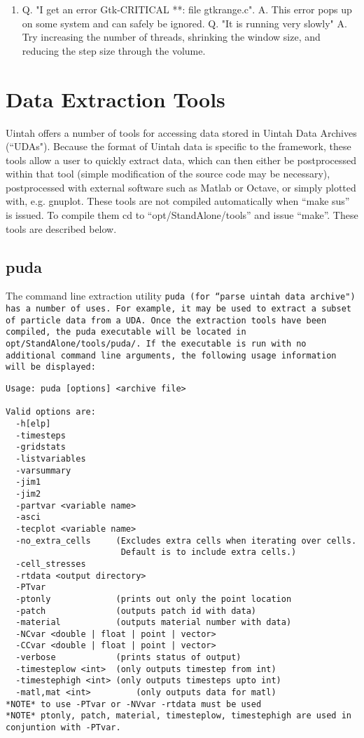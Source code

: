\begin{enumerate}
\item
Q. "I get an error Gtk-CRITICAL **: file gtkrange.c".
A.  This error pops up on some system and can safely be ignored.
Q.  "It is running very slowly"
A.  Try increasing the number of threads, shrinking the window size, and reducing the step size through the volume.
\end{enumerate}


\chapter{Data Extraction Tools}

Uintah offers a number of tools for accessing data stored in Uintah Data
Archives (``UDAs").  Because the format of Uintah data is specific to the
framework, these tools allow a user to quickly extract data, which can then
either be postprocessed within that tool (simple modification of the source
code may be necessary), postprocessed with external software such as
Matlab or Octave, or simply plotted with, e.g. gnuplot.  These tools are not compiled automatically when ``make sus'' is issued.  To compile them cd to ``opt/StandAlone/tools'' and issue ``make''.  These tools
are described below.

\section{puda}

The command line extraction utility \tt puda \normalfont
(for ``parse uintah data archive") has a number of uses.  For example, it
may be used to extract a subset of particle data from a UDA.  Once the
extraction tools have been compiled, the puda executable will be located in 
\tt opt/StandAlone/tools/puda/. \normalfont  If the executable is run with
no additional command line arguments, the following usage information will be
displayed:

\begin{Verbatim}[fontsize=\footnotesize]
Usage: puda [options] <archive file>

Valid options are:
  -h[elp]
  -timesteps
  -gridstats
  -listvariables
  -varsummary
  -jim1
  -jim2
  -partvar <variable name>
  -asci
  -tecplot <variable name>
  -no_extra_cells     (Excludes extra cells when iterating over cells.
                       Default is to include extra cells.)
  -cell_stresses
  -rtdata <output directory>
  -PTvar
  -ptonly             (prints out only the point location
  -patch              (outputs patch id with data)
  -material           (outputs material number with data)
  -NCvar <double | float | point | vector>
  -CCvar <double | float | point | vector>
  -verbose            (prints status of output)
  -timesteplow <int>  (only outputs timestep from int)
  -timestephigh <int> (only outputs timesteps upto int)
  -matl,mat <int>         (only outputs data for matl)
*NOTE* to use -PTvar or -NVvar -rtdata must be used
*NOTE* ptonly, patch, material, timesteplow, timestephigh are used in conjuntion with -PTvar.
\end{Verbatim}

